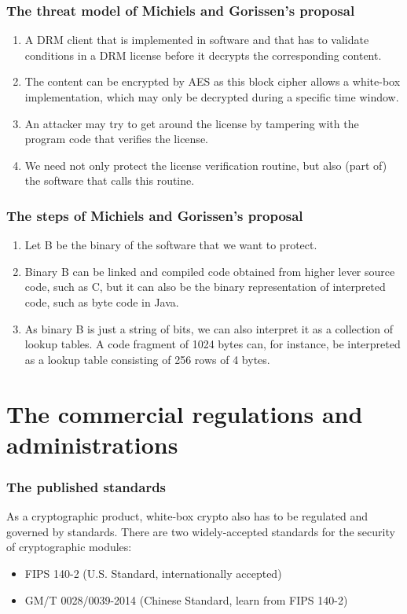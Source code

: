 \documentclass{beamer}
\begin{document}
\frame
{
\frametitle{The threat model of Michiels and Gorissen's proposal}
\begin{enumerate}
\setlength{\itemsep}{12pt}
\item A DRM client that is implemented in software and that has to validate conditions in a DRM license before it decrypts the corresponding content. \item The content can be encrypted by AES as this block cipher allows a white-box implementation, which may only be decrypted during a specific time window. 
\item An attacker may try to get around the license by tampering with the program code that verifies the license. 
\item We need not only protect the license verification routine, but also (part of) the software that calls this routine. 
\end{enumerate}
}

\frame
{
\frametitle{The steps of Michiels and Gorissen's proposal}
\begin{enumerate}
\setlength{\itemsep}{12pt}
\item Let B be the binary of the software that we want to protect. 
\item Binary B can be linked and compiled code obtained from higher lever source code, such as C, but it can also be the binary representation of interpreted code, such as byte code in Java. 
\item As binary B is just a string of bits, we can also interpret it as a collection of lookup tables. A code fragment of 1024 bytes can, for instance, be interpreted as a lookup table consisting of 256 rows of 4 bytes.
\end{enumerate}
}

\section{The commercial regulations and administrations}

\frame
{
\frametitle{The published standards}
As a cryptographic product, white-box crypto also has to be regulated and governed by standards.  There are two widely-accepted standards for the security of cryptographic modules:

\begin{itemize}
\setlength{\itemsep}{12pt}
\item FIPS 140-2 (U.S. Standard, internationally accepted)

\item GM/T 0028/0039-2014 (Chinese Standard, learn from FIPS 140-2)
\end{itemize}
}
\end{document}
